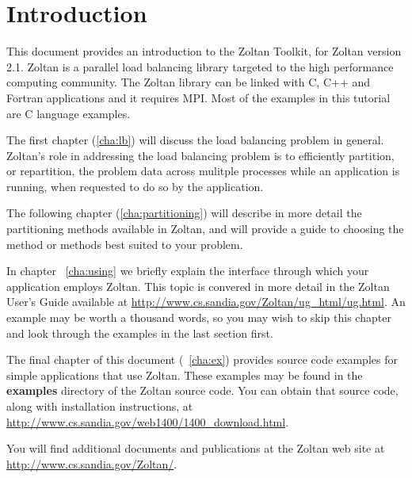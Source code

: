 %
% 
%
\chapter{Introduction}

This document provides an introduction to the Zoltan Toolkit,
for Zoltan version 2.1.  Zoltan is a parallel load balancing library
targeted to the high performance computing community.  The Zoltan
library can be
linked with C, C++ and Fortran applications and it requires MPI.  
Most of the examples in this tutorial are C language examples.

The first chapter (\ref{cha:lb})
will discuss the load balancing problem in general.
Zoltan's role in addressing the load balancing problem is to 
efficiently partition,
or repartition, the problem data across mulitple processes while an
application is running, when requested to do so by the application.

The following chapter (\ref{cha:partitioning})
will describe in more detail the partitioning
methods available in Zoltan, and will provide a guide
to choosing the method or methods best suited to your problem.

In chapter ~\ref{cha:using} we briefly explain the interface
through which your application employs Zoltan.  This topic is
convered in more detail in the
Zoltan User's Guide available at
\url{http://www.cs.sandia.gov/Zoltan/ug_html/ug.html}.
An example may be worth a thousand words, so you may wish to 
skip this chapter and look through the examples in the last section first.

The final chapter of this document (~\ref{cha:ex}) provides
source code examples for simple applications that use Zoltan.
These examples may be found in the \textbf{examples} directory
of the Zoltan source code.  You can obtain that source code,
along with installation instructions, at
\url{http://www.cs.sandia.gov/web1400/1400_download.html}.

You will find additional documents and publications at the
Zoltan web site at \url{http://www.cs.sandia.gov/Zoltan/}.

